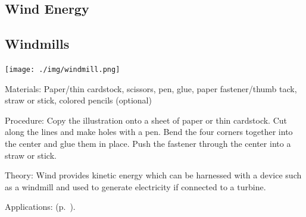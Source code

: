 \begin{multicols}{2}

\section*{Wind Energy}


\subsection{Windmills}

\begin{center}
\texttt{[image: ./img/windmill.png]}
\end{center}

\begin{description*}
\item[Materials:]{Paper/thin cardstock, scissors, pen, glue, paper fastener/thumb tack, straw or stick, colored pencils (optional)}
\item[Procedure:]{Copy the illustration onto a sheet of paper or thin cardstock. Cut along the lines and make holes with a pen. Bend the four corners together into the center and glue them in place. Push the fastener through the center into a straw or stick.}
\item[Theory:]{Wind provides kinetic energy which can be harnessed with a device such as a windmill and used to generate electricity if connected to a turbine.}
\item[Applications:]{ (p.~\pageref{sub:wind-turbine}).}
\end{description*}




\end{multicols}

\pagebreak